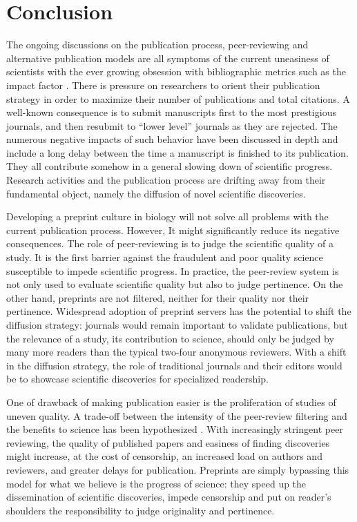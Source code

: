 \documentclass[10pt]{article}
\begin{document}
\section*{Conclusion}

The ongoing discussions on the publication process, peer-reviewing and
alternative publication models are all symptoms of the current uneasiness of
scientists with the ever growing obsession with bibliographic metrics such as
the impact factor \cite{Fisher2012}. There is pressure on researchers to orient
their publication strategy in order to maximize their number of publications and
total citations. A well-known consequence is to submit manuscripts first to the
most prestigious journals, and then resubmit to ``lower level'' journals as they
are rejected. The numerous negative impacts of such behavior have been discussed
in depth \cite{hoc09} and include a long delay between the time a manuscript is
finished to its publication.  They all contribute somehow in a general slowing
down of scientific progress.  Research activities and the publication process
are drifting away from their fundamental object, namely the diffusion of novel
scientific discoveries. 

Developing a preprint culture in biology will not solve all problems with the
current publication process. However, It might significantly reduce its negative
consequences. The role of peer-reviewing is to judge the scientific quality of a
study. It is the first barrier against the fraudulent and poor quality science
susceptible to impede scientific progress. In practice, the peer-review system
is not only used to evaluate scientific quality but also to judge pertinence. On
the other hand, preprints are not filtered, neither for their quality nor their
pertinence. Widespread adoption of preprint servers has the potential to shift
the diffusion strategy: journals would remain important to validate
publications, but the relevance of a study, its contribution to science, should
only be judged by many more readers than the typical two-four anonymous
reviewers. With a shift in the diffusion strategy, the role of traditional
journals and their editors would be to showcase scientific discoveries for
specialized readership. 

One of drawback of making publication easier is the proliferation of studies of
uneven quality. A trade-off between the intensity of the peer-review filtering
and the benefits to science has been hypothesized \cite{Aarssen2012}.  With
increasingly stringent peer reviewing, the quality of published papers and
easiness of finding discoveries might increase, at the cost of censorship, an
increased load on authors and reviewers, and greater delays for publication.
Preprints are simply bypassing this model for what we believe is the progress of
science: they speed up the dissemination of scientific discoveries, impede
censorship and put on reader's shoulders the responsibility to judge originality
and pertinence.
\end{document}

